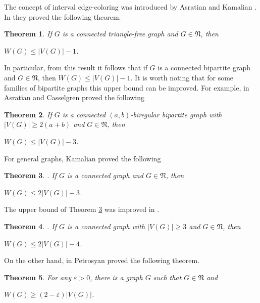 \documentclass[fleqn,12pt,twoside]{article}
\newtheorem{theorem}{Theorem}
\begin{document}
The concept of interval edge-coloring was introduced by Asratian and
Kamalian \cite{b2}. In \cite{b2,b3} they proved the following
theorem.

\begin{theorem}
\label{mytheorem1} If $G$ is a connected triangle-free graph and
$G\in \mathfrak{N}$, then
\begin{center}
$W(G)\leq \vert V(G)\vert -1$.
\end{center}
\end{theorem}

In particular, from this result it follows that if $G$ is a
connected bipartite graph and $G\in \mathfrak{N}$, then $W(G)\leq
\vert V(G)\vert -1$. It is worth noting that for some families of
bipartite graphs this upper bound can be improved. For example, in
\cite{b1} Asratian and Casselgren proved the following

\begin{theorem}
\label{mytheorem2} If $G$ is a connected $(a,b)$-biregular bipartite
graph with $\vert V(G)\vert \geq 2(a+b)$ and $G\in \mathfrak{N}$,
then
\begin{center}
$W(G)\leq \vert V(G)\vert -3$.
\end{center}
\end{theorem}

For general graphs, Kamalian proved the following

\begin{theorem}
\label{mytheorem3}\cite{b6}. If $G$ is a connected graph and $G\in
\mathfrak{N}$, then
\begin{center}
$W(G)\leq 2\vert V(G)\vert -3$.
\end{center}
\end{theorem}

The upper bound of Theorem \ref{mytheorem3} was improved in
\cite{b5}.

\begin{theorem}
\label{mytheorem4}\cite{b5}. If $G$ is a connected graph with $\vert
V(G)\vert \geq 3$ and $G\in \mathfrak{N}$, then
\begin{center}
$W(G)\leq 2\vert V(G)\vert -4$.
\end{center}
\end{theorem}

On the other hand, in \cite{b7} Petrosyan proved the following
theorem.

\begin{theorem}
\label{mytheorem4} For any $\varepsilon >0$, there is a graph $G$
such that $G\in \mathfrak{N}$ and
\begin{center}
$W\left(G\right)\geq \left( 2-\varepsilon \right) \left\vert
V\left(G\right)\right\vert$.
\end{center}
\end{theorem}
\end{document}
